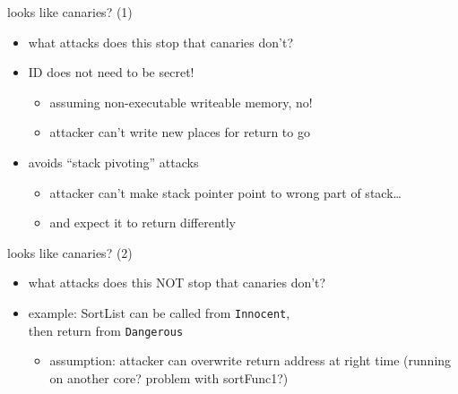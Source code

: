 \begin{frame}{looks like canaries? (1)}
    \begin{itemize}
    \item what attacks does this stop that canaries don't?
    \vspace{.5cm}
    \item<2-> ID does not need to be secret!
        \begin{itemize}
        \item<2-> assuming non-executable writeable memory, no!
        \item<2-> attacker can't write new places for return to go
        \end{itemize}
    \item<3-> avoids ``stack pivoting'' attacks
        \begin{itemize}
        \item attacker can't make stack pointer point to wrong part of stack\ldots
        \item and expect it to return differently
        \end{itemize}
    \end{itemize}
\end{frame}

\begin{frame}[fragile,label=cfiLikeCanariesP2]{looks like canaries? (2)}
    \begin{itemize}
    \item what attacks does this NOT stop that canaries don't?
    \item example: SortList can be called from \texttt{Innocent}, \\ then return from \texttt{Dangerous}
        \begin{itemize}
        \item assumption: attacker can overwrite return address at right time (running on another core? problem with sortFunc1?)
        \end{itemize}
    \end{itemize}
\end{frame}
